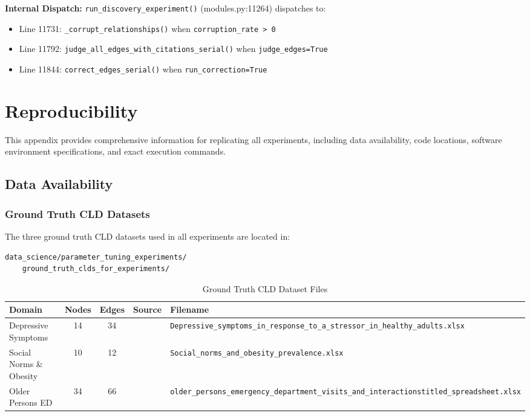 \textbf{Internal Dispatch:} \texttt{run\_discovery\_experiment()} (modules.py:11264) dispatches to:
\begin{itemize}[noitemsep]
    \item Line 11731: \texttt{\_corrupt\_relationships()} when \texttt{corruption\_rate > 0}
    \item Line 11792: \texttt{judge\_all\_edges\_with\_citations\_serial()} when \texttt{judge\_edges=True}
    \item Line 11844: \texttt{correct\_edges\_serial()} when \texttt{run\_correction=True}
\end{itemize}

\section{Reproducibility}
\label{sec:reproducibility}

This appendix provides comprehensive information for replicating all experiments, including data availability, code locations, software environment specifications, and exact execution commands.

\subsection{Data Availability}
\label{sec:data_availability}

\subsubsection{Ground Truth CLD Datasets}

The three ground truth CLD datasets used in all experiments are located in:
\begin{verbatim}
data_science/parameter_tuning_experiments/
    ground_truth_clds_for_experiments/
\end{verbatim}

\begin{table}[H]
\centering
\caption{Ground Truth CLD Dataset Files}
\label{tab:gt_files}
\footnotesize
\begin{tabularx}{\textwidth}{@{}l c c l X@{}}
\toprule
\textbf{Domain} & \textbf{Nodes} & \textbf{Edges} & \textbf{Source} & \textbf{Filename} \\
\midrule
Depressive Symptoms & 14 & 34 & \citet{uleman2024triangulation} & \texttt{Depressive\_symptoms\_in\_response\_to\_a\_stressor\_in\_healthy\_adults.xlsx} \\
Social Norms \& Obesity & 10 & 12 & \citet{crielaard2020socialnorms} & \texttt{Social\_norms\_and\_obesity\_prevalence.xlsx} \\
Older Persons ED & 34 & 66 & \citet{smeekes2023emergency} & \texttt{older\_persons\_emergency\_department\_visits\_and\_interactionstitled\_spreadsheet.xlsx} \\
\bottomrule
\end{tabularx}
\end{table}

